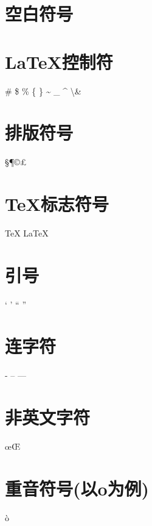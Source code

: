 \documentclass{article}
\begin{document}
  	\section{空白符号}
  	\section{\LaTeX 控制符}
  	\# \$ \% \{ \} \~{} \_{} \^{} \textbackslash \&
  	\section{排版符号}
  	\S \P \dag \ddag \copyright \pounds
  	\section{\TeX 标志符号}
  	\TeX{} \LaTeX{} \LaTeXe{}
  	\XeLaTeX
  	\section{引号}
  	‘ ’ “ ”
  	\section{连字符}
  	- -- ---
  	\section{非英文字符}
  	\oe \OE
  	\section{重音符号(以o为例)}
  	\`o
  
\end{document}
